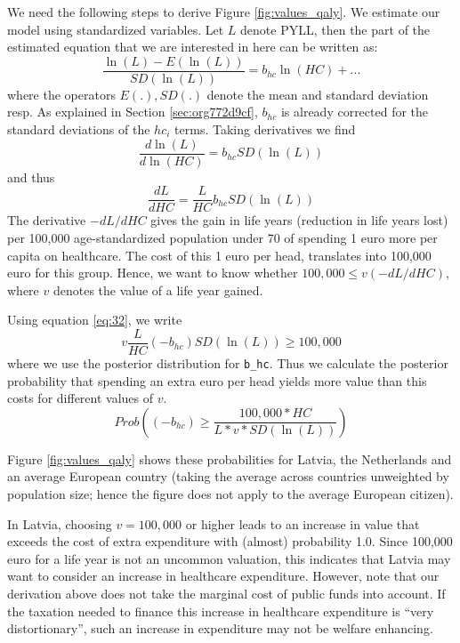\documentclass[a4paper,12pt]{article}
\begin{document}
We need the following steps to derive Figure \ref{fig:values_qaly}. We estimate our model using standardized variables. Let \(L\) denote PYLL, then the part of the estimated equation that we are interested in here can be written as:
\begin{equation}
\label{eq:27}
\frac{\ln(L)-E(\ln(L))}{SD(\ln(L))} = b_{hc} \ln(HC) + ...
\end{equation}
where the operators \(E(.),SD(.)\) denote the mean and standard deviation resp. As explained in Section \ref{sec:org772d9cf}, \(b_{hc}\) is already corrected for the standard deviations of the \(hc_i\) terms. Taking derivatives we find
\begin{equation}
\label{eq:31}
\frac{d \ln(L)}{d \ln(HC)} = b_{hc} SD(\ln(L))
\end{equation}
and thus
\begin{equation}
\label{eq:32}
\frac{dL}{dHC} = \frac{L}{HC} b_{hc} SD(\ln(L))
\end{equation}
The derivative \(-dL/dHC\) gives the gain in life years (reduction in life years lost) per 100,000 age-standardized population under 70 of spending 1 euro more per capita on healthcare. The cost of this 1 euro per head, translates into 100,000 euro for this group. Hence, we want to know whether \(100,000 \leq v (-dL/dHC)\), where \(v\) denotes the value of a life year gained. 

Using equation \eqref{eq:32}, we write
\begin{equation}
\label{eq:22}
v \frac{L}{HC} (-b_{hc}) SD(\ln(L)) \geq 100,000
\end{equation}
where we use the posterior distribution for \texttt{b\_hc}. Thus we calculate the posterior probability that spending an extra euro per head yields more value than this costs for different values of \(v\).
\begin{equation}
\label{eq:41}
Prob \left((-b_{hc}) \geq \frac{100,000 * HC}{L* v *SD(\ln(L))}\right)
\end{equation}

Figure \ref{fig:values_qaly} shows these probabilities for Latvia, the Netherlands and an average European country (taking the average across countries unweighted by population size; hence the figure does not apply to the average European citizen).

In Latvia, choosing \(v = 100,000\) or higher leads to an increase in value that exceeds the cost of extra expenditure with (almost) probability 1.0. Since 100,000 euro for a life year is not an uncommon valuation, this indicates that Latvia may want to consider an increase in healthcare expenditure. However, note that our derivation above does not take the marginal cost of public funds into account. If the taxation needed to finance this increase in healthcare expenditure is ``very distortionary'', such an increase in expenditure may not be welfare enhancing.
\end{document}
